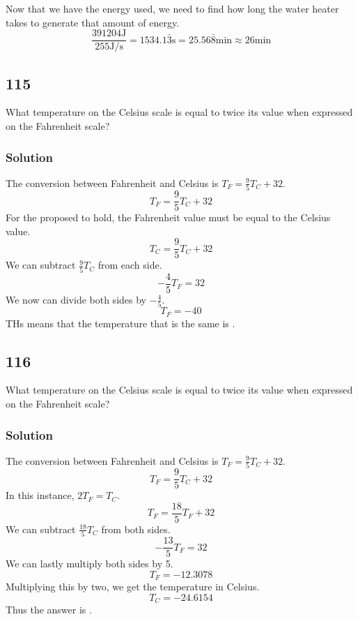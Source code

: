 \documentclass[11pt]{report}
\begin{document}
Now that we have the energy used, we need to find how long the water heater takes to generate that amount of energy.
\begin{equation*}
    \frac{391204\unit{\joule}}{255\unit{\joule/\second}} = 1534.1\bar{3}\unit{\second} = 25.56\bar{8}\unit{\minute} \approx \boxed{26\unit{\minute}}
\end{equation*}


\section{115}
What temperature on the Celsius scale is equal to twice its value when expressed on the Fahrenheit scale?

\subsection{Solution}
The conversion between Fahrenheit and Celsius is $T_F = \frac{9}{5} T_C + 32$. 
\[T_F = \frac{9}{5} T_C + 32\]
For the proposed to hold, the Fahrenheit value must be equal to the Celsius value.
\[T_C = \frac{9}{5} T_C + 32\]
We can subtract $\frac{9}{5} T_C$ from each side.
\[-\frac{4}{5} T_F = 32\]
We now can divide both sides by $-\frac{4}{5}$.
\[T_F = -40\]
THs means that the temperature that is the same is \boxed{-40\unit{\degreeCelsius}}.


\section{116}
What temperature on the Celsius scale is equal to twice its value when expressed on the Fahrenheit scale?

\subsection{Solution}
The conversion between Fahrenheit and Celsius is $T_F = \frac{9}{5} T_C + 32$.
\[ T_F = \frac{9}{5} T_C + 32 \]
In this instance, $2T_F = T_C$.
\[ T_F = \frac{18}{5}T_F + 32 \]
We can subtract $\frac{18}{5}T_C$ from both sides.
\[ -\frac{13}{5}T_F = 32 \]
We can lastly multiply both sides by 5.
\[ T_F = -12.3078 \]
Multiplying this by two, we get the temperature in Celsius.
\[ T_C = -24.6154 \]
Thus the answer is \boxed{-24.6154\unit{\celsius}}.

\setcounter{chapter}{4}
\pagebreak

\chapter{}
\end{document}
